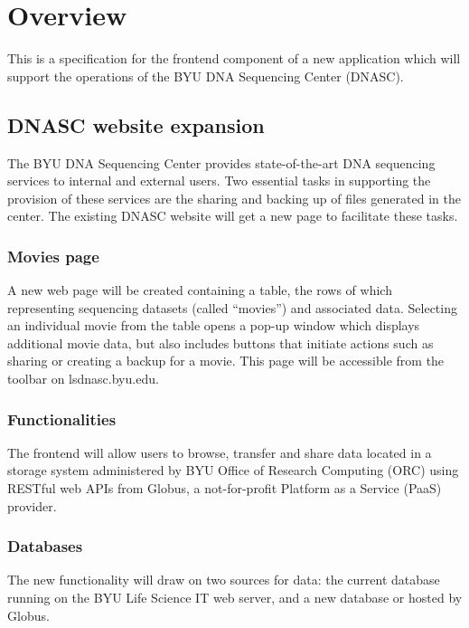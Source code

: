 
\section{Overview}

This is a specification for the frontend component of a new application which will
support the operations of the BYU DNA Sequencing Center (DNASC).

\subsection{DNASC website expansion}

The BYU DNA Sequencing Center provides state-of-the-art DNA sequencing services 
to internal and external users. Two essential tasks in supporting the provision of these 
services are the sharing and backing up of files generated in the center. The existing 
DNASC website  will get a new page to facilitate these tasks.

\subsubsection{Movies page}
A new web page will be created containing a table, the rows of which representing sequencing 
datasets (called ``movies'') and associated data. Selecting an individual movie from the 
table opens a pop-up window which displays additional movie data, but also includes
buttons that initiate actions such as sharing or creating a backup for a movie. This page 
will be accessible from the toolbar on lsdnasc.byu.edu.

\subsubsection{Functionalities}
The frontend will allow users to browse, transfer and share data located in a storage system 
administered by BYU Office of Research Computing (ORC) using RESTful web APIs from 
Globus, a not-for-profit Platform as a Service (PaaS) provider.

\subsubsection{Databases}
The new functionality will draw on two sources for data: the current database running on the 
BYU Life Science IT web server, and a new database or  
hosted by Globus.

